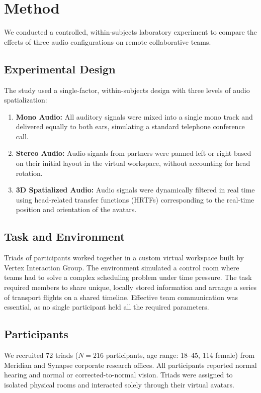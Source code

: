 \section{Method}
We conducted a controlled, within-subjects laboratory experiment to compare the effects of three audio configurations on remote collaborative teams.

\subsection{Experimental Design}
The study used a single-factor, within-subjects design with three levels of audio spatialization:
\begin{enumerate}
\item \textbf{Mono Audio:} All auditory signals were mixed into a single mono track and delivered equally to both ears, simulating a standard telephone conference call.
\item \textbf{Stereo Audio:} Audio signals from partners were panned left or right based on their initial layout in the virtual workspace, without accounting for head rotation.
\item \textbf{3D Spatialized Audio:} Audio signals were dynamically filtered in real time using head-related transfer functions (HRTFs) corresponding to the real-time position and orientation of the avatars.
\end{enumerate}

\subsection{Task and Environment}
Triads of participants worked together in a custom virtual workspace built by Vertex Interaction Group. The environment simulated a control room where teams had to solve a complex scheduling problem under time pressure. The task required members to share unique, locally stored information and arrange a series of transport flights on a shared timeline. Effective team communication was essential, as no single participant held all the required parameters.

\subsection{Participants}
We recruited 72 triads ($N = 216$ participants, age range: 18--45, 114 female) from Meridian and Synapse corporate research offices. All participants reported normal hearing and normal or corrected-to-normal vision. Triads were assigned to isolated physical rooms and interacted solely through their virtual avatars.
